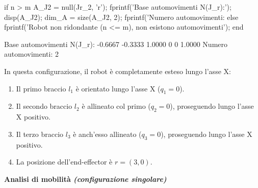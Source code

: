 \documentclass[11pt, a4paper]{article}
\begin{document}
\begin{matlabcode}
if n > m
    A_J2 = null(Jr_2, 'r');
    fprintf('Base automovimenti N(J_r):\n');
    disp(A_J2);
    dim_A = size(A_J2, 2);
    fprintf('Numero automovimenti: %
else
    fprintf('Robot non ridondante (n <= m), non esistono automovimenti\n');
end
\end{matlabcode}
\begin{matlaboutput}
Base automovimenti N(J_r):
   -0.6667   -0.3333
    1.0000         0
         0    1.0000
Numero automovimenti: 2
\end{matlaboutput}
\newpage
{}
\begin{par}
\begin{flushleft}
In questa configurazione, il robot è completamente esteso lungo l'asse X:
\begin{enumerate}
   \item \begin{flushleft} Il primo braccio $l_1$ è orientato lungo l'asse X ($q_1 = 0$). \end{flushleft}
    \item \begin{flushleft} Il secondo braccio $l_2$ è allineato col primo ($q_2 = 0$), proseguendo lungo l'asse X positivo. \end{flushleft}
    \item \begin{flushleft} Il terzo braccio $l_3$ è anch'esso allineato ($q_3 = 0$), proseguendo lungo l'asse X positivo. \end{flushleft}
    \item \begin{flushleft} La posizione dell'end-effector è $r = (3,0)$. \end{flushleft}
\end{enumerate}
\end{flushleft}
\end{par}

\begin{par}
\begin{flushleft}
\textbf{Analisi di mobilità \textit{(configurazione singolare)}}
\end{flushleft}
\end{par}
\end{document}
